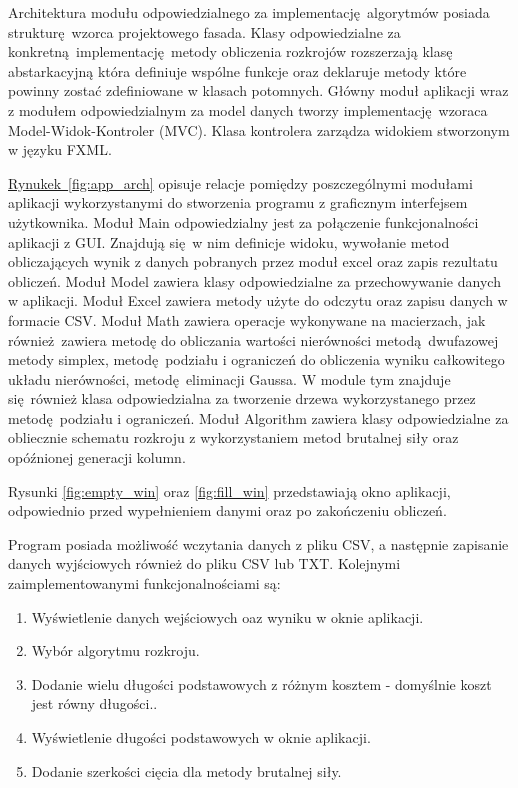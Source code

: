 Architektura modułu odpowiedzialnego za implementację algorytmów posiada strukturę wzorca projektowego fasada. Klasy odpowiedzialne za konkretną implementację metody obliczenia rozkrojów rozszerzają klasę abstarkacyjną która definiuje wspólne funkcje oraz deklaruje metody które powinny zostać zdefiniowane w klasach potomnych. Główny moduł aplikacji wraz z modułem odpowiedzialnym za model danych tworzy implementację wzoraca Model-Widok-Kontroler (MVC). Klasa kontrolera zarządza widokiem stworzonym w języku FXML.

\hyperref[fig:java_arch]{Rynukek~\ref*{fig:app_arch}} opisuje relacje pomiędzy poszczególnymi modułami aplikacji wykorzystanymi do stworzenia programu z graficznym interfejsem użytkownika. Moduł Main odpowiedzialny jest za połączenie funkcjonalności aplikacji z GUI. Znajdują się w nim definicje widoku, wywołanie metod obliczających wynik z danych pobranych przez moduł excel oraz zapis rezultatu obliczeń. Moduł Model zawiera klasy odpowiedzialne za przechowywanie danych w aplikacji. Moduł Excel zawiera metody użyte do odczytu oraz zapisu danych w formacie CSV. Moduł Math zawiera operacje wykonywane na macierzach, jak również zawiera metodę do obliczania wartości nierówności metodą dwufazowej metody simplex, metodę podziału i ograniczeń do obliczenia wyniku całkowitego układu nierówności, metodę eliminacji Gaussa. W module tym znajduje się również klasa odpowiedzialna za tworzenie drzewa wykorzystanego przez metodę podziału i ograniczeń. Moduł Algorithm zawiera klasy odpowiedzialne za obliecznie schematu rozkroju z wykorzystaniem metod brutalnej siły oraz opóźnionej generacji kolumn.

Rysunki \ref{fig:empty_win} oraz \ref{fig:fill_win} przedstawiają okno aplikacji, odpowiednio przed wypełnieniem danymi oraz po zakończeniu obliczeń.

Program posiada możliwość wczytania danych z pliku CSV, a następnie zapisanie danych wyjściowych również do pliku CSV lub TXT. Kolejnymi zaimplementowanymi funkcjonalnościami są:
\begin{enumerate}
  \item Wyświetlenie danych wejściowych oaz wyniku w oknie aplikacji.
  \item Wybór algorytmu rozkroju.
  \item Dodanie wielu długości podstawowych z różnym kosztem - domyślnie koszt jest równy długości..
  \item Wyświetlenie długości podstawowych w oknie aplikacji.
  \item Dodanie szerkości cięcia dla metody brutalnej siły.
\end{enumerate}

